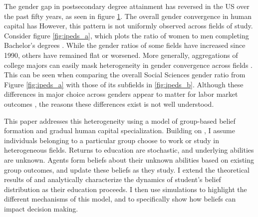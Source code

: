 \begin{figure}[b!] %
\centering

\label{fig:n_degrees}
\end{figure}
\begin{figure}[t!] %
\centering

\end{figure}

The gender gap in postsecondary degree attainment has reversed in the US over the past fifty years, as seen in figure \ref{fig:n_degrees}.
The overall gender convergence in human capital has  
However, this pattern is not uniformly observed across fields of study.
Consider figure \ref{fig:ipeds_a}, which plots the ratio of women to men completing Bachelor's degrees .
While the gender ratios of some fields have increased since 1990, others have remained flat or worsened. 
More generally, aggregations of college majors can easily mask heterogeneity in gender convergence across fields \parencite{BHST08}.
This can be seen when comparing the overall Social Sciences gender ratio from Figure \ref{fig:ipeds_a} with those of its subfields in \ref{fig:ipeds_b}.
Although these differences in major choice across genders appear to matter for labor market outcomes \parencite{SHB19}, the reasons these differences exist is not well understood. 

This paper addresses this heterogeneity using a model of group-based belief formation and gradual human capital specialization. 
Building on \textcite{AF20}, I assume individuals belonging to a particular group choose to work or study in heterogeneous fields. 
Returns to education are stochastic, and underlying abilities are unknown.
Agents form beliefs about their unknown abilities based on existing group outcomes, and update these beliefs as they study. 
I extend the theoretical results of \textcite{AF20} and analytically characterize the dynamics of student's belief distribution as their education proceeds. 
I then use simulations to highlight the different mechanisms of this model, and to specifically show how beliefs can impact decision making. 

